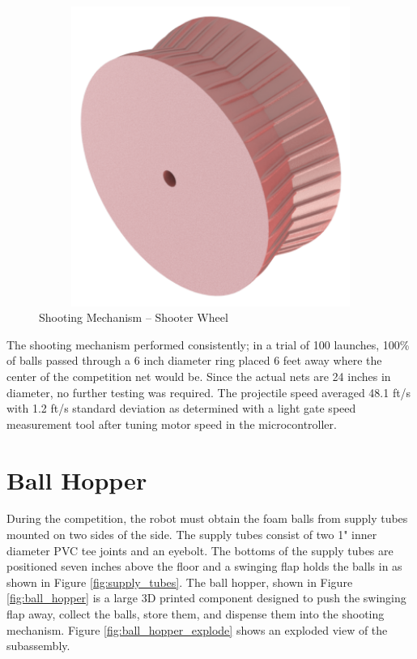 \begin{figure}[H]   %
	\centering \includegraphics[width=6in, height=3.85in, keepaspectratio]{figures/shooter_wheel.png}
	\caption{Shooting Mechanism -- Shooter Wheel}	\label{fig:shooter_wheel}
\end{figure}

The shooting mechanism performed consistently; in a trial of 100 launches, 100\% of balls passed through a 6 inch diameter ring placed 6 feet away where the center of the competition net would be. Since the actual nets are 24 inches in diameter, no further testing was required. The projectile speed averaged 48.1 ft/s with 1.2 ft/s standard deviation as determined with a light gate speed measurement tool after tuning motor speed in the microcontroller.

\section{Ball Hopper}
During the competition, the robot must obtain the foam balls from supply tubes mounted on two sides of the side. The supply tubes consist of two 1" inner diameter PVC tee joints and an eyebolt. The bottoms of the supply tubes are positioned seven inches above the floor and a swinging flap holds the balls in as shown in Figure \ref{fig:supply_tubes}. The ball hopper, shown in Figure \ref{fig:ball_hopper} is a large 3D printed component designed to push the swinging flap away, collect the balls, store them, and dispense them into the shooting mechanism. Figure \ref{fig:ball_hopper_explode} shows an exploded view of the subassembly.


